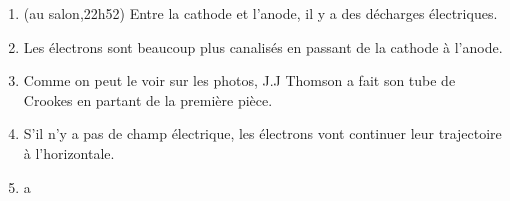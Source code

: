 \documentclass[../main.tex]{subfiles}
\begin{document}
\begin{enumerate}
    \item (au salon,22h52) Entre la cathode et l'anode, il y a des décharges électriques.
    \item Les électrons sont beaucoup plus canalisés en passant de la cathode à l'anode. 
    \item Comme on peut le voir sur les photos, J.J Thomson a fait son tube de Crookes en partant de la première pièce. 
    \item S'il n'y a pas de champ électrique, les électrons vont continuer leur trajectoire à l'horizontale. 
    \item a
    
\end{enumerate}
\end{document}
